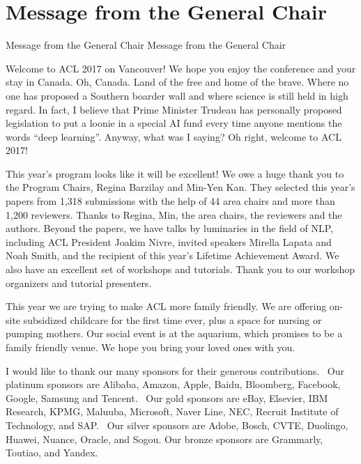 \vspace{2em}

\section{Message from the General Chair}\vspace{2em}
\setheaders%
    {Message from the General Chair}%
    {Message from the General Chair}
\thispagestyle{emptyheader}

\setlength{\parskip}{1ex}

Welcome to ACL 2017 on Vancouver!  We hope you enjoy the conference and your
stay in Canada. Oh, Canada. Land of the free and home of the brave. Where no
one has proposed a Southern boarder wall and where science is still held in
high regard.  In fact, I believe that Prime Minister Trudeau has personally
proposed legislation to put a loonie in a special AI fund every time anyone
mentions the words ``deep learning''.  Anyway, what was I saying? Oh right,
welcome to ACL 2017!

This year's program looks like it will be excellent!  We owe a huge thank you
to the Program Chairs, Regina Barzilay and Min-Yen Kan.  They selected this
year's papers from 1,318 submissions with the help of 44 area chairs and more
than 1,200 reviewers. Thanks to Regina, Min, the area chairs, the reviewers
and the authors. Beyond the papers, we have talks by luminaries in the field
of NLP, including ACL President Joakim Nivre, invited speakers Mirella 
Lapata and Noah Smith, and the recipient of this year's Lifetime Achievement
Award.  We also have an excellent set of workshops and tutorials. Thank you to
our workshop organizers and tutorial presenters.

This year we are trying to make ACL more family friendly. We are offering
on-site subsidized childcare for the first time ever, plus a space for nursing
or pumping mothers. Our social event is at the aquarium, which promises to be
a family friendly venue. We hope you bring your loved ones with you.

I would like to thank our many sponsors for their generous contributions.  
Our platinum sponsors are 
Alibaba, 
Amazon, 
Apple, 
Baidu, 
Bloomberg, 
Facebook, 
Google, 
Samsung and 
Tencent.  
Our gold sponsors are 
eBay, 
Elsevier, 
IBM Research, 
KPMG, 
Maluuba, 
Microsoft, 
Naver Line, 
NEC,
Recruit Institute of Technology, and 
SAP.  
Our silver sponsors are 
Adobe,
Bosch,
CVTE,
Duolingo,
Huawei,
Nuance,
Oracle, and
Sogou.
Our bronze sponsors are 
Grammarly, 
Toutiao, and 
Yandex.

